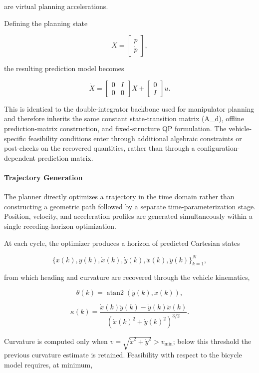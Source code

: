 are virtual planning accelerations.

Defining the planning state

\[ X = \begin{bmatrix} p\\ \dot p \end{bmatrix},\]

the resulting prediction model becomes

\[ \dot X = \begin{bmatrix} 0&I\\ 0&0\end{bmatrix} X + \begin{bmatrix} 0\\ I \end{bmatrix} u. \]

This is identical to the double-integrator backbone used for manipulator
planning and therefore inherits the same constant state-transition
matrix (A\_d), offline prediction-matrix construction, and
fixed-structure QP formulation. The vehicle-specific feasibility
conditions enter through additional algebraic constraints or post-checks
on the recovered quantities, rather than through a
configuration-dependent prediction matrix.

\paragraph{Trajectory Generation}\label{trajectory-generation}

The planner directly optimizes a trajectory in the time domain rather
than constructing a geometric path followed by a separate
time-parameterization stage. Position, velocity, and acceleration
profiles are generated simultaneously within a single receding-horizon
optimization.

At each cycle, the optimizer produces a horizon of predicted Cartesian
states

\[ \{x(k),y(k),\dot x(k),\dot y(k),\ddot x(k),\ddot y(k)\} _{k=1}^{N},\]

from which heading and curvature are recovered through the vehicle
kinematics,

\[ \theta(k)=\operatorname{atan2}(\dot y(k),\dot x(k)),\]

\[ \kappa(k) = \frac{\dot x(k)\ddot y(k)-\dot y(k)\ddot x(k)}
{\left(\dot x(k)^2+\dot y(k)^2\right)^{3/2}}. \]

Curvature is computed only when \(v=\sqrt{\dot x^2+\dot y^2}>v_{\min}\);
below this threshold the previous curvature estimate is retained.
Feasibility with respect to the bicycle model requires, at minimum,

